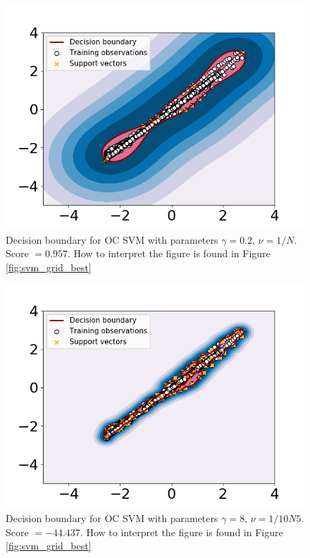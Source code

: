     \begin{figure}
        \centering
        \includegraphics[width = .7\textwidth]{report/figures/analysis/gridsearch/Novelty detection, 5 training, gamma = 0.2 nu = 0.00010583130489998942.png}
        \caption{Decision boundary for OC SVM with parameters $\gamma = 0.2$, $\nu = 1/N$. Score $=0.957$. How to interpret the figure is found in Figure \ref{fig:svm_grid_best}}
        \label{fig:my_label}
    \end{figure}
    
    
    \begin{figure}
        \centering
        \includegraphics[width = .7\textwidth]{report/figures/analysis/gridsearch/Novelty detection, -5 training, gamma = 8 nu = 1.0583130489998942e-05.png}
        \caption{Decision boundary for OC SVM with parameters $\gamma = 8$, $\nu = 1/10N5$. Score $=-44.437$. How to interpret the figure is found in Figure \ref{fig:svm_grid_best}}
        \label{fig:my_label}
    \end{figure}
    
